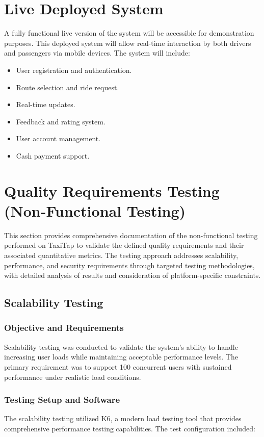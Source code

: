 \documentclass[12pt]{article}
\begin{document}
\section{Live Deployed System}
A fully functional live version of the system will be accessible for demonstration purposes. This deployed system will allow real-time interaction by both drivers and passengers via mobile devices. The system will include:
\begin{itemize}
    \item User registration and authentication.
    \item Route selection and ride request.
    \item Real-time updates.
    \item Feedback and rating system.
    \item User account management.
    \item Cash payment support.
\end{itemize}

\section{Quality Requirements Testing (Non-Functional Testing)}

This section provides comprehensive documentation of the non-functional testing performed on TaxiTap to validate the defined quality requirements and their associated quantitative metrics. The testing approach addresses scalability, performance, and security requirements through targeted testing methodologies, with detailed analysis of results and consideration of platform-specific constraints.

\subsection{Scalability Testing}

\subsubsection{Objective and Requirements}
Scalability testing was conducted to validate the system's ability to handle increasing user loads while maintaining acceptable performance levels. The primary requirement was to support 100 concurrent users with sustained performance under realistic load conditions.

\subsubsection{Testing Setup and Software}
The scalability testing utilized K6, a modern load testing tool that provides comprehensive performance testing capabilities. The test configuration included:
\end{document}
